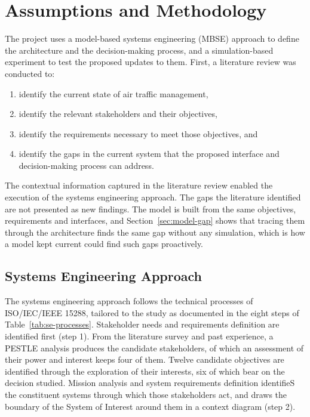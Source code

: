 \section{Assumptions and Methodology}
\label{sec:methodology}

The project uses a model-based systems engineering (MBSE) approach to define the architecture and the decision-making process, and a simulation-based experiment to test the proposed updates to them. First, a literature review was conducted to:
\begin{enumerate}
    \item identify the current state of air traffic management,
    \item identify the relevant stakeholders and their objectives,
    \item identify the requirements necessary to meet those objectives, and
    \item identify the gaps in the current system that the proposed interface and decision-making process can address.
\end{enumerate}
The contextual information captured in the literature review enabled the execution of the systems engineering approach.
The gaps the literature identified are not presented as new findings. The model is built from the same objectives, requirements and interfaces, and Section~\ref{sec:model-gap} shows that tracing them through the architecture finds the same gap without any simulation, which is how a model kept current could find such gaps proactively.

\subsection{Systems Engineering Approach}
\label{sec:se-approach}

The systems engineering approach follows the technical processes of ISO/IEC/IEEE 15288, tailored to the study as documented in the eight steps of Table~\ref{tab:se-processes}. Stakeholder needs and requirements definition are identified first (step 1). From the literature survey and past experience, a PESTLE analysis produces the candidate stakeholders, of which an assessment of their power and interest keeps four of them. Twelve candidate objectives are identified through the exploration of their interests, six of which bear on the decision studied. Mission analysis and system requirements definition identifieS the constituent systems through which those stakeholders act, and draws the boundary of the System of Interest around them in a context diagram (step 2). 

